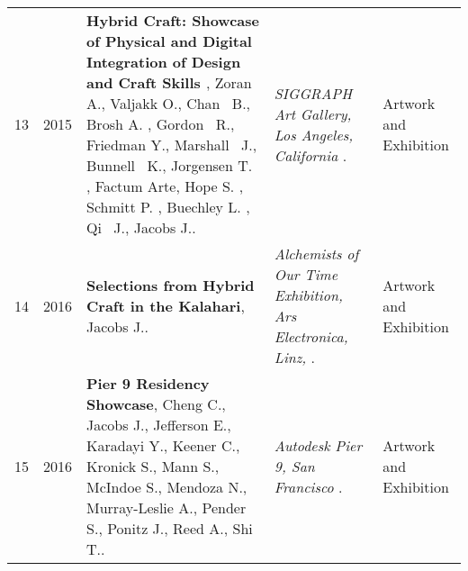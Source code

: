 \begin{longtable}{lcp{7.50cm}>{\raggedright}p{5.25cm}p{2cm}}
    13 & 2015 & {\bf Hybrid Craft: Showcase of Physical and Digital Integration of Design and Craft Skills }, Zoran A., Valjakk O., Chan  B., Brosh A. , Gordon  R., Friedman Y., Marshall  J., Bunnell  K., Jorgensen T. , Factum Arte, Hope S. , Schmitt P. , Buechley L. , Qi  J., Jacobs J.. & \emph{ SIGGRAPH Art Gallery, Los Angeles, California  }.  & Artwork and Exhibition\\
    14 & 2016 & {\bf Selections from Hybrid Craft in the Kalahari}, Jacobs J.. & \emph{ Alchemists of Our Time Exhibition, Ars Electronica, Linz,  }.  & Artwork and Exhibition\\
    15 & 2016 & {\bf Pier 9 Residency Showcase}, Cheng C., Jacobs J., Jefferson E., Karadayi Y., Keener C., Kronick S., Mann S., McIndoe S., Mendoza N., Murray-Leslie A., Pender S., Ponitz J., Reed A., Shi T.. & \emph{ Autodesk Pier 9, San Francisco }.  & Artwork and Exhibition\\

\end{longtable}
